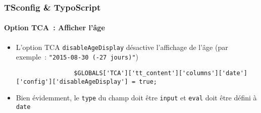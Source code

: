 \begin{frame}[fragile]
	\frametitle{TSconfig \& TypoScript}
	\framesubtitle{Option TCA~: Afficher l'âge}

	\lstset{basicstyle=\tiny\ttfamily}

	\begin{itemize}

		\item L'option TCA \texttt{disableAgeDisplay} désactive l'affichage de l'âge\newline
			\small
				(par exemple~: \texttt{"2015-08-30 (-27 jours)"})
			\normalsize

			\begin{lstlisting}
				$GLOBALS['TCA']['tt_content']['columns']['date']['config']['disableAgeDisplay'] = true;
			\end{lstlisting}

		\item Bien évidemment, le \texttt{type} du champ doit être \texttt{input}
			et \texttt{eval} doit être défini à \texttt{date}

	\end{itemize}

\end{frame}

